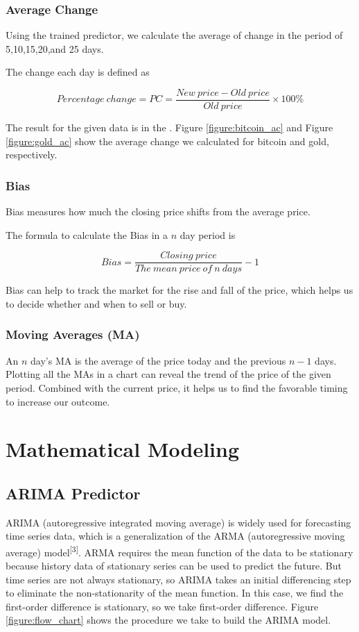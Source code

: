 \documentclass[12pt,a4paper]{article}
\newcommand{\Predictor}{ARIMA }
\begin{document}
\begin{spacing}{1.2}
\subsubsection{Average Change}

Using the trained predictor, we calculate the average of change in the period of 5,10,15,20,and 25 days.

The change each day is defined as

$$
Percentage \ change = PC = \frac{New \ price-Old \ price}{Old \ price} \times 100\%
$$


The result for the given data is in the . Figure \ref{figure:bitcoin_ac} and Figure \ref{figure:gold_ac} show the average change we calculated for bitcoin and gold, respectively.


\subsubsection{Bias}

Bias measures how much the closing price shifts from the average price.

The formula to calculate the Bias in a $n$ day period is

$$
Bias = \frac{Closing \ price}{The \ mean \ price \ of \ n \ days} - 1
$$

Bias can help to track the market for the rise and fall of the price, which helps us to decide whether and when to sell or buy.

\subsubsection{Moving Averages (MA)}

An $n$ day's MA is the average of the price today and the previous $n-1$ days. Plotting all the MAs in a chart can reveal the trend of the price of the given period. Combined with the current price, it helps us to find the favorable timing to increase our outcome.

\section{Mathematical Modeling}
\label{MathModels}

\subsection{\Predictor Predictor}

\Predictor (autoregressive integrated moving average) is widely used for forecasting time series data, which is a generalization of the ARMA (autoregressive moving average) model\textsuperscript{[3]}. ARMA requires the mean function of the data to be stationary because history data of stationary series can be used to predict the future. But time series are not always stationary, so ARIMA takes an initial differencing step to eliminate the non-stationarity of the mean function. In this case, we find the first-order difference is stationary, so we take first-order difference. Figure \ref{figure:flow_chart} shows the procedure we take to build the \Predictor model.


\end{spacing}
\end{document}
